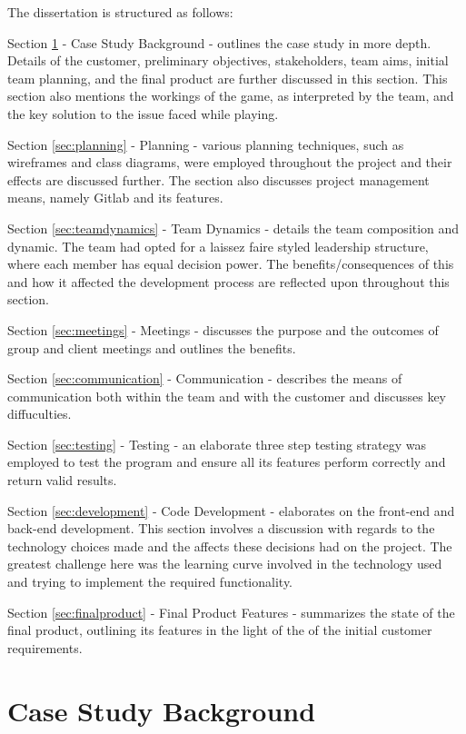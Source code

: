 \documentclass{l3proj}
\begin{document}
The dissertation is structured as follows:

Section \ref{sec:casestudy} - Case Study Background - outlines the case study in more depth. Details of the customer, preliminary objectives, stakeholders, team aims, initial team planning, and the final product are further discussed in this section. This section also mentions the workings of the game, as interpreted by the team, and the key solution to the issue faced while playing.

Section \ref{sec:planning} - Planning - various planning techniques, such as wireframes and class diagrams, were employed throughout the project and their effects are discussed further. The section also discusses project management means, namely Gitlab and its features.

Section \ref{sec:teamdynamics} -  Team Dynamics - details the team composition and dynamic. The team had opted for a laissez faire styled leadership structure, where each member has equal decision power. The benefits/consequences of this and how it affected the development process are reflected upon throughout this section.

Section \ref{sec:meetings} - Meetings - discusses the purpose and the outcomes of group and client meetings and outlines the benefits.

Section \ref{sec:communication} - Communication - describes the means of communication both within the team and with the customer and discusses key diffuculties.

Section \ref{sec:testing} - Testing - an elaborate three step testing strategy was employed to test the program and ensure all its features perform correctly and return valid results.

Section \ref{sec:development} - Code Development - elaborates on the front-end and back-end development. This section involves a discussion with regards to the technology choices made and the affects these decisions had on the project. The greatest challenge here was the learning curve involved in the technology used and trying to implement the required functionality.

Section \ref{sec:finalproduct} - Final Product Features - summarizes the state of the final product, outlining its features in the light of the of the initial customer requirements.

\section{Case Study Background}
\label{sec:casestudy}
\end{document}
